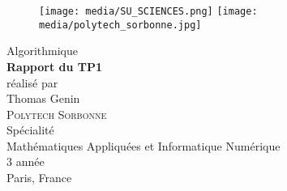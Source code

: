 
\usepackage[autolanguage]{numprint}
\setlength{\parindent}{25pt}

\newpage
\thispagestyle{empty}
\begin{figure}[h!]
	\texttt{[image: media/SU\_SCIENCES.png]}
	\hfill
	\texttt{[image: media/polytech\_sorbonne.jpg]}
\end{figure}

\vspace{5\baselineskip}

\begin{center}
    \Large
    Algorithmique\\
    \vspace{2\baselineskip}
	\textbf{\Huge\color{bleuperso} Rapport du TP1}\\
	\vspace{2\baselineskip}
	réalisé par\\
    \vspace{2\baselineskip}
	Thomas Genin\\
	\vfill
	\textsc{Polytech Sorbonne}\\
    \vspace{0.5\baselineskip}
	Spécialité\\
    \vspace{0.5\baselineskip}
	Mathématiques Appliquées et Informatique Numérique\\
    \vspace{0.5\baselineskip}
	3 année\\
    \vspace{0.5\baselineskip}
    \Large Paris, France \the\year
\end{center}
